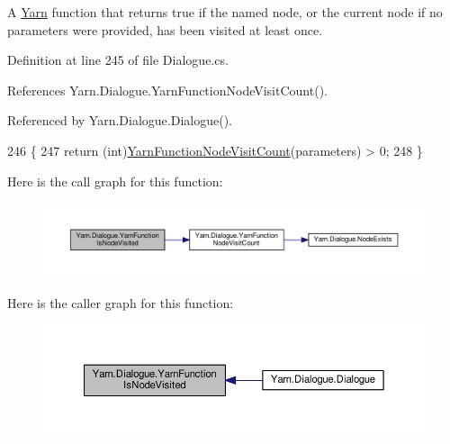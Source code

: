 A \hyperlink{a00048}{Yarn} function that returns true if the named node, or the current node if no parameters were provided, has been visited at least once. 



Definition at line 245 of file Dialogue.\-cs.



References Yarn.\-Dialogue.\-Yarn\-Function\-Node\-Visit\-Count().



Referenced by Yarn.\-Dialogue.\-Dialogue().


\begin{DoxyCode}
246         \{
247             \textcolor{keywordflow}{return} (\textcolor{keywordtype}{int})\hyperlink{a00088_a10c9f22d3f55e74f091cd6069c431094}{YarnFunctionNodeVisitCount}(parameters) > 0;
248         \}
\end{DoxyCode}


Here is the call graph for this function\-:
\nopagebreak
\begin{figure}[H]
\begin{center}
\leavevmode
\includegraphics[width=350pt]{a00088_a1ab129bd84381928531d503304ca08d6_cgraph}
\end{center}
\end{figure}




Here is the caller graph for this function\-:
\nopagebreak
\begin{figure}[H]
\begin{center}
\leavevmode
\includegraphics[width=350pt]{a00088_a1ab129bd84381928531d503304ca08d6_icgraph}
\end{center}
\end{figure}


